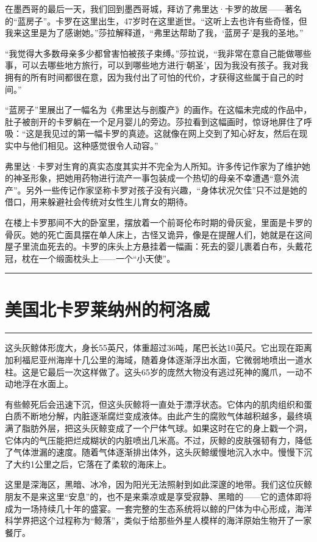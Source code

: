 \documentclass[12pt,oneside]{book}
\newcommand\hr{\par\noindent\hrule}
\begin{document}
在墨西哥的最后一天，我们回到墨西哥城，拜访了弗里达·卡罗的故居——著名的“蓝房子”。卡罗在这里出生，47岁时在这里逝世。“这听上去也许有些奇怪，但我来这里是为了感谢她。”莎拉解释道，“弗里达帮助了我，‘蓝房子’是我的圣地。”

“我觉得大多数母亲多少都曾害怕被孩子束缚。”莎拉说，“我非常在意自己能做哪些事，可以去哪些地方旅行，可以到哪些地方进行‘朝圣’，因为我没有孩子。我对我拥有的所有时间都很在意，因为我付出了可怕的代价，才获得这些属于自己的时间。”

“蓝房子”里展出了一幅名为《弗里达与剖腹产》的画作。在这幅未完成的作品中，肚子被剖开的卡罗躺在一个足月婴儿的旁边。莎拉看到这幅画时，惊讶地屏住了呼吸：“这是我见过的第一幅卡罗的真迹。这就像在网上交到了知心好友，然后在现实中与他们相见。这种感觉很令人动容。”

弗里达·卡罗对生育的真实态度其实并不完全为人所知。许多传记作家为了维护她的神圣形象，把她用药物进行流产一事包装成一个热切的母亲不幸遭遇“意外流产”。另外一些传记作家坚称卡罗对孩子没有兴趣，“身体状况欠佳”只不过是她的借口，用来躲避社会传统对女性生儿育女的期待。

在楼上卡罗那间不大的卧室里，摆放着一个前哥伦布时期的骨灰瓮，里面是卡罗的骨灰。她的死亡面具摆在单人床上，古怪又诡异，像是在提醒人们，她就是在这间屋子里流血死去的。卡罗的床头上方悬挂着一幅画：死去的婴儿裹着白布，头戴花冠，枕在一个缎面枕头上——一个“小天使”。

\hr

\section{美国北卡罗莱纳州的柯洛威}
\hr

这头灰鲸体形庞大，身长55英尺，体重超过36吨，尾巴长达10英尺。它出现在距离加利福尼亚州海岸十几公里的海域，随着身体逐渐浮出水面，它微弱地喷出一道水柱。这是它最后一次这样做了。这头65岁的庞然大物没有逃过死神的魔爪，一动不动地浮在水面上。

有些鲸死后会迅速下沉，但这头灰鲸将一直处于漂浮状态。它体内的肌肉组织和蛋白质不断地分解，内脏逐渐腐烂变成液体。由此产生的腐败气体越积越多，最终填满了脂肪外层，把这头灰鲸变成了一个尸体气球。如果这时在它的身上戳一个洞，它体内的气压能把烂成糊状的内脏喷出几米高。不过，灰鲸的皮肤强韧有力，降低了气体泄漏的速度。随着气体逐渐排出体外，这头灰鲸缓慢地沉入水中。慢慢下沉了大约1公里之后，它落在了柔软的海床上。

这里是深海区，黑暗、冰冷，因为阳光无法照射到如此深邃的地带。我们这位灰鲸朋友不是来这里“安息”的，也不是来乘凉或是享受寂静、黑暗的——它的遗体即将成为一场持续几十年的盛宴。一套完整的生态系统将以鲸的尸体为中心形成，海洋科学界把这个过程称为“鲸落”，类似于给那些外星人模样的海洋原始生物开了一家餐厅。
\end{document}

